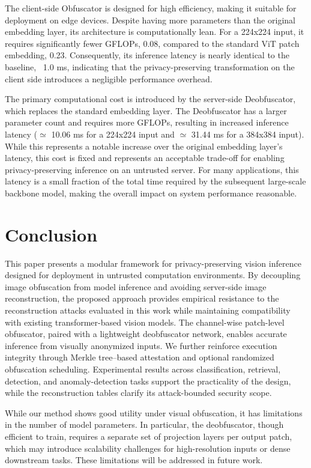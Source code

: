 \documentclass{ieeeaccess}
\newcommand{\rev}[1]{{\color{black}#1}}
\begin{document}
The client-side Obfuscator is designed for high efficiency, making it suitable for deployment on edge devices. Despite having more parameters than the original embedding layer, its architecture is computationally lean. For a 224x224 input, it requires significantly fewer GFLOPs, 0.08, compared to the standard ViT patch embedding, 0.23. Consequently, its inference latency is nearly identical to the baseline, ~1.0 ms, indicating that the privacy-preserving transformation on the client side introduces a negligible performance overhead.

The primary computational cost is introduced by the server-side Deobfuscator, which replaces the standard embedding layer. The Deobfuscator has a larger parameter count and requires more GFLOPs, resulting in increased inference latency ($\simeq$ 10.06 ms for a 224x224 input and $\simeq$ 31.44 ms for a 384x384 input). While this represents a notable increase over the original embedding layer's latency, this cost is fixed and represents an acceptable trade-off for enabling privacy-preserving inference on an untrusted server. For many applications, this latency is a small fraction of the total time required by the subsequent large-scale backbone model, making the overall impact on system performance reasonable.

\section{Conclusion} \label{sec:con}

\rev{This paper presents a modular framework for privacy-preserving vision inference designed for deployment in untrusted computation environments. By decoupling image obfuscation from model inference and avoiding server-side image reconstruction, the proposed approach provides empirical resistance to the reconstruction attacks evaluated in this work while maintaining compatibility with existing transformer-based vision models. The channel-wise patch-level obfuscator, paired with a lightweight deobfuscator network, enables accurate inference from visually anonymized inputs. We further reinforce execution integrity through Merkle tree--based attestation and optional randomized obfuscation scheduling. Experimental results across classification, retrieval, detection, and anomaly-detection tasks support the practicality of the design, while the reconstruction tables clarify its attack-bounded security scope.}

\rev{While our method shows good utility under visual obfuscation, it has limitations in the number of model parameters. In particular, the deobfuscator, though efficient to train, requires a separate set of projection layers per output patch, which may introduce scalability challenges for high-resolution inputs or dense downstream tasks. These limitations will be addressed in future work.}
\end{document}

